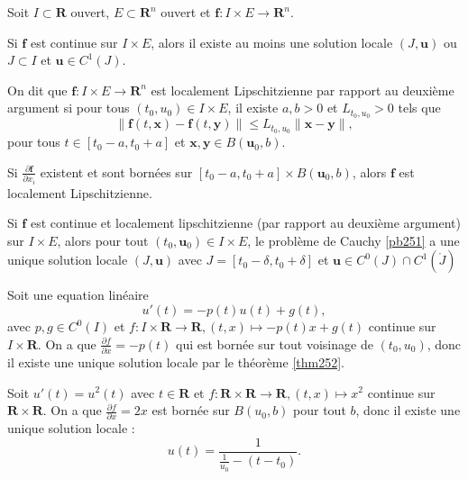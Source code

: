 Soit $I\subset \mathbf{R}$ ouvert, $E\subset \mathbf{R}^{n}$ ouvert et $\boldsymbol{f}:I\times E\to \mathbf{R}^{n}$.
\begin{theorem}\label{thm251}
Si $\boldsymbol{f}$ est continue sur $I\times E$, alors il existe au moins une solution locale $(J,\boldsymbol{u})$ ou $J\subset I$ et $\boldsymbol{u}\in C^{1}(J)$. 
\end{theorem}
\begin{definition}
On dit que $\boldsymbol{f}:I\times E\to \mathbf{R}^{n}$ est localement Lipschitzienne par rapport au deuxième argument si pour tous $(t_{0},u_{0})\in I\times E$, il existe $a,b>0$  et $L_{t_{0},u_{0}}>0$ tels que
$$
\lVert \boldsymbol{f}(t,\boldsymbol{x})-\boldsymbol{f}(t,\boldsymbol{y}) \rVert \le L_{t_{0},u_{0}}\lVert \boldsymbol{x}-\boldsymbol{y} \rVert,
$$
pour tous $t\in[t_{0}-a,t_{0}+a]$ et $\boldsymbol{x},\boldsymbol{y}\in B(\boldsymbol{u}_{0},b)$.
\end{definition}
\begin{remark}
Si $\frac{ \partial \boldsymbol{f} }{ \partial x_{i} }$ existent et sont bornées sur $[t_{0}-a,t_{0}+a]\times B(\boldsymbol{u}_{0},b)$, alors $\boldsymbol{f}$ est localement Lipschitzienne. 
\end{remark}
\begin{theorem}\label{thm252}
Si $\boldsymbol{f}$ est continue et localement lipschitzienne (par rapport au deuxième argument) sur $I\times E$, alors pour tout $(t_{0},\boldsymbol{u}_{0})\in I\times E$, le problème de Cauchy \ref{pb251} a une unique solution locale $(J,\boldsymbol{u})$ avec $J=[t_{0}-\delta,t_{0}+\delta]$ et $\boldsymbol{u}\in C^{0}(J)\cap C^{1}(\mathring{ J })$
\end{theorem}
\begin{example}
Soit une equation linéaire
$$
u'(t)=-p(t)u(t)+g(t),
$$
avec $p,g\in C^{0}(I)$ et $f:I\times \mathbf{R}\to \mathbf{R},(t,x)\mapsto -p(t)x+g(t)$ continue sur $I\times \mathbf{R}$. On a que $\frac{ \partial f }{ \partial x }=-p(t)$ qui est bornée sur tout voisinage de $(t_{0},u_{0})$, donc il existe une unique solution locale par le théorème \ref{thm252}.
\end{example}
\begin{example}
Soit $u'(t)=u^{2}(t)$ avec $t\in \mathbf{R}$ et $f:\mathbf{R}\times \mathbf{R}\to \mathbf{R},(t,x)\mapsto x^{2}$ continue sur $\mathbf{R}\times \mathbf{R}$. On a que $\frac{ \partial f }{ \partial x }=2x$ est bornée sur $B(u_{0},b)$ pour tout $b$, donc il existe une unique solution locale :
$$
u(t)=\frac{1}{\frac{1}{u_{0}}-(t-t_{0})}.
$$
\end{example}
